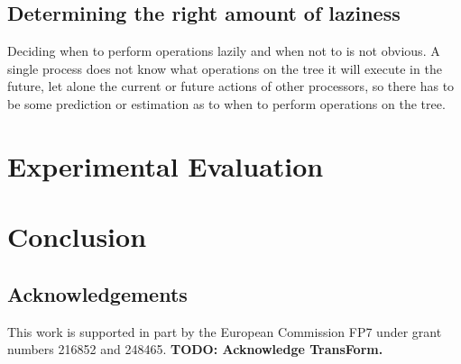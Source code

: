 \documentclass[10pt]{sigplanconf}
\begin{document}
\subsection{Determining the right amount of laziness}
Deciding when to perform operations lazily and when not to is not obvious.
A single process does not know what operations on the tree it will execute in the future, let alone the current or future actions of other processors,
so there has to be some prediction or estimation as to when to perform operations on the tree.

\section{Experimental Evaluation}

\section{Conclusion}

\subsection*{Acknowledgements}
This work is supported in part by the European Commission FP7 under grant numbers 216852 and 248465.
{\bf TODO: Acknowledge TransForm.}




\end{document}
